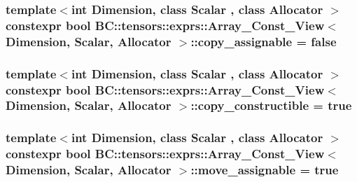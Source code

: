 \subsubsection[{\texorpdfstring{copy\+\_\+assignable}{copy_assignable}}]{\setlength{\rightskip}{0pt plus 5cm}template$<$int Dimension, class Scalar , class Allocator $>$ constexpr bool {\bf B\+C\+::tensors\+::exprs\+::\+Array\+\_\+\+Const\+\_\+\+View}$<$ Dimension, {\bf Scalar}, {\bf Allocator} $>$\+::copy\+\_\+assignable = false\hspace{0.3cm}{\ttfamily [static]}}\hypertarget{structBC_1_1tensors_1_1exprs_1_1Array__Const__View_a157f189e9ed3cbe65a71ae2a7a0b1550}{}\label{structBC_1_1tensors_1_1exprs_1_1Array__Const__View_a157f189e9ed3cbe65a71ae2a7a0b1550}
\subsubsection[{\texorpdfstring{copy\+\_\+constructible}{copy_constructible}}]{\setlength{\rightskip}{0pt plus 5cm}template$<$int Dimension, class Scalar , class Allocator $>$ constexpr bool {\bf B\+C\+::tensors\+::exprs\+::\+Array\+\_\+\+Const\+\_\+\+View}$<$ Dimension, {\bf Scalar}, {\bf Allocator} $>$\+::copy\+\_\+constructible = true\hspace{0.3cm}{\ttfamily [static]}}\hypertarget{structBC_1_1tensors_1_1exprs_1_1Array__Const__View_a5f5088e4a51d9fc5e0f9a8890719d789}{}\label{structBC_1_1tensors_1_1exprs_1_1Array__Const__View_a5f5088e4a51d9fc5e0f9a8890719d789}
\subsubsection[{\texorpdfstring{move\+\_\+assignable}{move_assignable}}]{\setlength{\rightskip}{0pt plus 5cm}template$<$int Dimension, class Scalar , class Allocator $>$ constexpr bool {\bf B\+C\+::tensors\+::exprs\+::\+Array\+\_\+\+Const\+\_\+\+View}$<$ Dimension, {\bf Scalar}, {\bf Allocator} $>$\+::move\+\_\+assignable = true\hspace{0.3cm}{\ttfamily [static]}}\hypertarget{structBC_1_1tensors_1_1exprs_1_1Array__Const__View_a956fa29e4f433d9547c29cfbce39cf64}{}\label{structBC_1_1tensors_1_1exprs_1_1Array__Const__View_a956fa29e4f433d9547c29cfbce39cf64}
